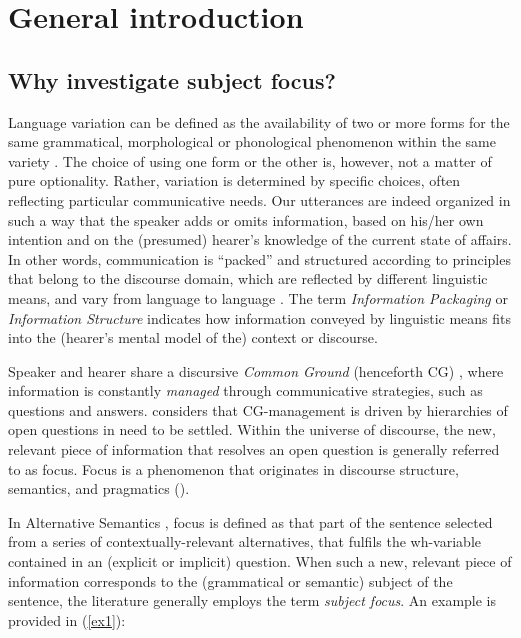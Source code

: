 \chapter{General introduction}


\section{Why investigate subject focus?}

Language variation can be defined as the availability of two or more forms for the same grammatical, morphological or phonological phenomenon within the same variety \parencite{labov1972sociolinguistic}. The choice of using one form or the other is, however, not a matter of pure optionality. Rather, variation is determined by specific choices, often reflecting particular communicative needs. Our utterances are indeed organized in such a way that the speaker adds or omits information, based on his/her own intention and on the (presumed) hearer’s knowledge of the current state of affairs. In other words, communication is ``packed” and structured according to principles that belong to the discourse domain, which are reflected by different linguistic means, and vary from language to language \parencite{krifka2008basic, komagata2003contextual, wardbirner2001discourse}. The term \textit{Information Packaging} \parencite{chafe1976givenness} or \textit{Information Structure} \parencite{halliday_1967} indicates how information conveyed by linguistic means fits into the (hearer’s mental model of the) context or discourse.

Speaker and hearer share a discursive \textit{Common Ground} (henceforth CG) \parencite{stalnaker1974pragmatic, karttunen1974presupposition, lewis1979scorekeeping, simons2025availability}, where information is constantly \textit{managed} through communicative strategies, such as questions and answers. \textcite{roberts1996information} considers that CG-management is driven by hierarchies of open questions in need to be settled. Within the universe of discourse, the new, relevant piece of information that resolves an open question is generally referred to as focus. Focus is a phenomenon that originates in discourse structure, semantics, and pragmatics (\cite{krifka2008basic, rooth1985association, rooth1992theory, schwarzschild1999givenness, von1990current}). 

In Alternative Semantics \parencite{rooth1985association, rooth1992theory}, focus is defined as that part of the sentence selected from a series of contextually-relevant alternatives, that fulfils the wh-variable contained in an (explicit or implicit) question. 
When such a new, relevant piece of information corresponds to the (grammatical or semantic) subject of the sentence, the literature generally employs the term \textit{subject focus}. An example is provided in (\ref{ex1}):

